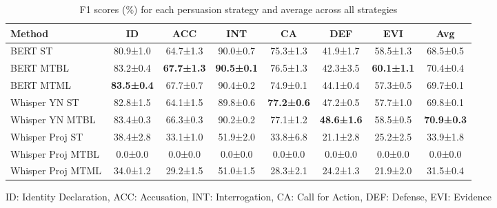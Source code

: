 \documentclass{article}
\begin{document}
\begin{table}[ht]
\centering
\small
\caption{F1 scores (\%) for each persuasion strategy and average across all strategies}
\label{tab:f1_scores}
\setlength{\tabcolsep}{4pt}
\begin{tabular}{@{}lccccccc@{}}
\toprule
Method & ID & ACC & INT & CA & DEF & EVI & Avg \\
\midrule
BERT ST & 80.9±1.0 & 64.7±1.3 & 90.0±0.7 & 75.3±1.3 & 41.9±1.7 & 58.5±1.3 & 68.5±0.5 \\
BERT MTBL & 83.2±0.4 & \textbf{67.7±1.3} & \textbf{90.5±0.1} & 76.5±1.3 & 42.3±3.5 & \textbf{60.1±1.1} & 70.4±0.4 \\
BERT MTML & \textbf{83.5±0.4} & 67.7±0.7 & 90.4±0.2 & 74.9±0.1 & 44.1±0.4 & 57.3±0.5 & 69.7±0.1 \\
Whisper YN ST & 82.8±1.5 & 64.1±1.5 & 89.8±0.6 & \textbf{77.2±0.6} & 47.2±0.5 & 57.7±1.0 & 69.8±0.1 \\
Whisper YN MTBL & 83.4±0.3 & 66.3±0.3 & 90.2±0.2 & 77.1±1.2 & \textbf{48.6±1.6} & 58.5±0.5 & \textbf{70.9±0.3} \\
Whisper Proj ST & 38.4±2.8 & 33.1±1.0 & 51.9±2.0 & 33.8±6.8 & 21.1±2.8 & 25.2±2.5 & 33.9±1.8 \\
Whisper Proj MTBL & 0.0±0.0 & 0.0±0.0 & 0.0±0.0 & 0.0±0.0 & 0.0±0.0 & 0.0±0.0 & 0.0±0.0 \\
Whisper Proj MTML & 34.0±1.2 & 29.2±1.5 & 51.0±1.5 & 28.3±2.1 & 24.2±1.3 & 21.9±2.0 & 31.5±0.4 \\
\bottomrule
\end{tabular}
\parbox{\textwidth}{\small ID: Identity Declaration, ACC: Accusation, INT: Interrogation, CA: Call for Action, DEF: Defense, EVI: Evidence}
\end{table}
\end{document}
